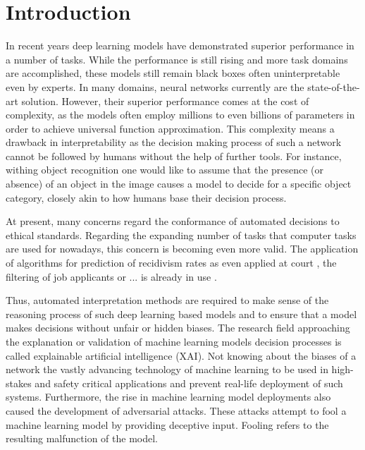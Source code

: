 \section{Introduction}
\label{sec:introduction}

In recent years deep learning models have demonstrated superior performance in a number of tasks. While the performance is still rising and more task domains are accomplished, these models still remain black boxes often uninterpretable even by experts. 
In many domains, neural networks currently are the state-of-the-art solution. However, their superior performance comes at the cost of complexity, as the models often employ millions to even billions of parameters in order to achieve universal function approximation. This complexity means a drawback in interpretability as the decision making process of such a network cannot be followed by humans without the help of further tools. For instance, withing object recognition one would like to assume that the presence (or absence) of an object in the image causes a model to decide for a specific object category, closely akin to how humans base their decision process. 

At present, many concerns regard the conformance of automated decisions to ethical standards. Regarding the expanding number of tasks that computer tasks are used for nowadays, this concern is becoming even more valid. The application of algorithms for prediction of recidivism rates as even applied at court \cite{chouldechova2017fair}, the filtering of job applicants or ... is already in use \cite{lipton2018mythos}. 






Thus, automated interpretation methods are required to make sense of the reasoning process of such deep learning based models and to ensure that a model makes decisions without unfair or hidden biases. 
The research field approaching the explanation or validation of machine learning models decision processes is called explainable artificial intelligence (XAI).
Not knowing about the biases of a network the vastly advancing technology of machine learning to be used in high-stakes and safety critical applications and prevent real-life deployment of such systems. 
Furthermore, the rise in machine learning model deployments also caused the development of adversarial attacks. These attacks attempt to fool a machine learning model by providing deceptive input. Fooling refers to the resulting malfunction of the model. 

